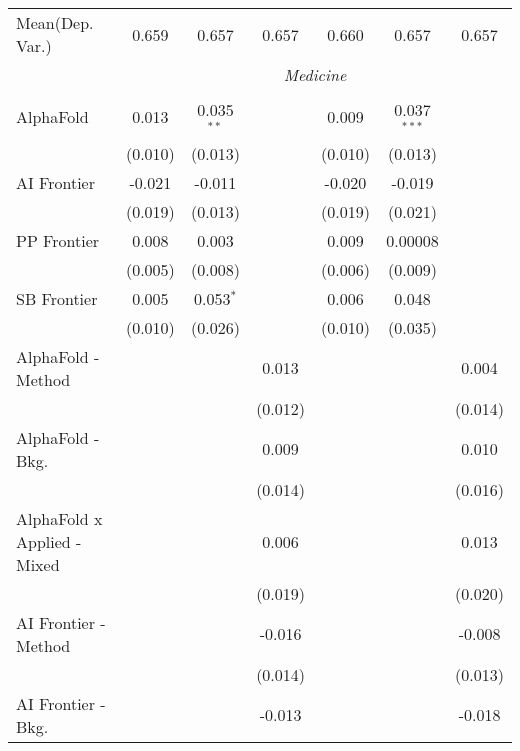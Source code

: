 \begin{tabular}{lcccccc}
Mean(Dep. Var.) & 0.659 & 0.657 & 0.657 & 0.660 & 0.657 & 0.657 \\
 & \multicolumn{6}{c}{\textit{Medicine}} \\ \\
   AlphaFold                   & 0.013   & 0.035$^{**}$ &         & 0.009   & 0.037$^{***}$ &   \\   
                               & (0.010) & (0.013)      &         & (0.010) & (0.013)       &   \\   
   AI Frontier                 & -0.021  & -0.011       &         & -0.020  & -0.019        &   \\   
                               & (0.019) & (0.013)      &         & (0.019) & (0.021)       &   \\   
   PP Frontier                 & 0.008   & 0.003        &         & 0.009   & 0.00008       &   \\   
                               & (0.005) & (0.008)      &         & (0.006) & (0.009)       &   \\   
   SB Frontier                 & 0.005   & 0.053$^{*}$  &         & 0.006   & 0.048         &   \\   
                               & (0.010) & (0.026)      &         & (0.010) & (0.035)       &   \\   
   AlphaFold - Method          &         &              & 0.013   &         &               & 0.004\\   
                               &         &              & (0.012) &         &               & (0.014)\\   
   AlphaFold - Bkg.            &         &              & 0.009   &         &               & 0.010\\   
                               &         &              & (0.014) &         &               & (0.016)\\   
   AlphaFold x Applied - Mixed &         &              & 0.006   &         &               & 0.013\\   
                               &         &              & (0.019) &         &               & (0.020)\\   
   AI Frontier - Method        &         &              & -0.016  &         &               & -0.008\\   
                               &         &              & (0.014) &         &               & (0.013)\\   
   AI Frontier - Bkg.          &         &              & -0.013  &         &               & -0.018\\   

\end{tabular}

